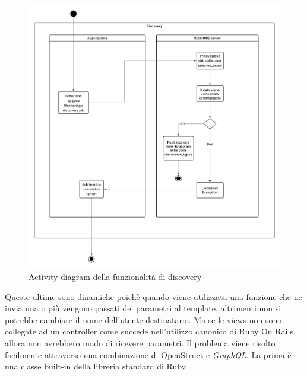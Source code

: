 \documentclass[target=bach,aauheader=,style=]{thud}
\begin{document}
\begin{figure}[h]
\centering
\includegraphics[width=0.8\linewidth]{Discovery Flowchart.png}
\caption{Activity diagram della funzionalità di discovery}
\label{fig:discovery_flowchart}
\end{figure}








Queste ultime sono dinamiche poichè quando viene utilizzata una funzione che ne invia una o più vengono passati dei parametri al template, altrimenti non si
potrebbe cambiare il nome dell'utente destinatario. Ma se le views non sono collegate ad un controller come succede nell'utilizzo canonico di Ruby On Rails, allora
non avrebbero modo di ricevere parametri. Il problema viene risolto facilmente attraverso una combinazione di OpenStruct e \textit{GraphQL}.
La prima è una classe built-in della libreria standard di Ruby
\end{document}
